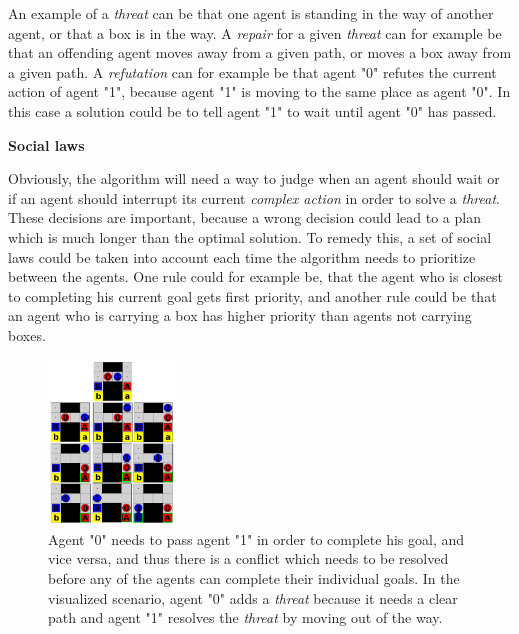 \documentclass[Main]{subfiles}
\begin{document}
An example of a \textit{threat} can be that one agent is standing in the way of another agent, or that a box is in the way.
A \textit{repair} for a given \textit{threat} can for example be that an offending agent moves away from a given path, or moves a box away from a given path.
A \textit{refutation} can for example be that agent "0" refutes the current action of agent "1", because agent "1" is moving to the same place as agent "0". In this case a solution could be to tell agent "1" to wait until agent "0" has passed.


\textbf{Social laws}

Obviously, the algorithm will need a way to judge when an agent should wait or if an agent should interrupt its current \textit{complex action} in order to solve a \textit{threat}. These decisions are important, because a wrong decision could lead to a plan which is much longer than the optimal solution.
To remedy this, a set of social laws could be taken into account each time the algorithm needs to prioritize between the agents.
One rule could for example be, that the agent who is closest to completing his current goal gets first priority, and another rule could be that an agent who is carrying a box has higher priority than agents not carrying boxes.

\begin{figure}[h!]
	\centering
	\includegraphics[width=0.3\textwidth]{plan_collab.png}
	\caption{Agent "0" needs to pass agent "1" in order to complete his goal, and vice versa, and thus there is a conflict which needs to be resolved before any of the agents can complete their individual goals. In the visualized scenario, agent "0" adds a \textit{threat} because it needs a clear path and agent "1" resolves the \textit{threat} by moving out of the way.}
	\label{fig:plan_collab}
\end{figure}
\end{document}
